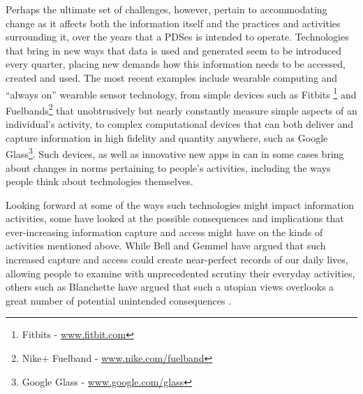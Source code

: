 \documentclass[graybox]{svmult}
\begin{document}
Perhaps the ultimate set of challenges, however, pertain to accommodating change as it affects both the information itself and the practices and activities surrounding it, over the years that a PDSes is intended to operate.  Technologies that bring in new ways that data is used and generated seem to be introduced every quarter, placing new demands how this information needs to be accessed, created and used.  The most recent examples include wearable computing and ``always on'' wearable sensor technology, from simple devices such as Fitbits \footnote{Fitbits - \url{www.fitbit.com}} and Fuelbands\footnote{Nike+ Fuelband - \url{www.nike.com/fuelband}} that unobtrusively but nearly constantly measure simple aspects of an individual's activity, to complex computational devices that can both deliver and capture information in high fidelity and quantity anywhere, such as Google Glass\footnote{Google Glass - \url{www.google.com/glass}}.  Such devices, as well as innovative new apps in can in some cases bring about changes in norms pertaining to people's activities, including the ways people think about technologies themselves.


Looking forward at some of the ways such technologies might impact information activities, some have looked at the possible consequences and implications that ever-increasing information capture and access might have on the kinds of activities mentioned above.  While Bell and Gemmel have argued \cite{totalrecall} that such increased capture and access could create near-perfect records of our daily lives, allowing people to examine with unprecedented scrutiny their everyday activities, others such as Blanchette have argued that such a utopian views overlooks a great number of potential unintended consequences \cite{blanchette}.   

\end{document}
